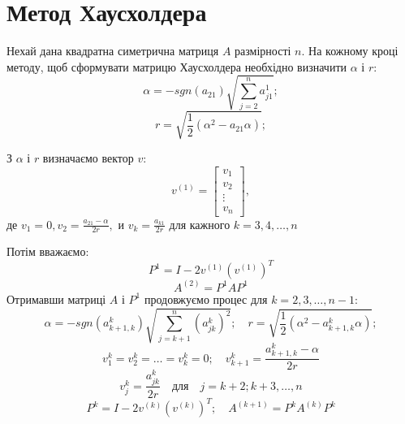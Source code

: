 \documentclass[serif,12pt,unicode]{beamer}
\begin{document}
\section{Метод Хаусхолдера}
\begin{frame}
Нехай дана квадратна симетрична матриця $A$ размірності $n.$
На кожному кроці методу, щоб сформувати матрицю Хаусхолдера необхідно визначити $\alpha$ і $r$:
\begin{equation*}
    \alpha = - sgn(a_{21}) \sqrt{\sum_{j=2}^n a_{j1}^1};
\end{equation*}
\begin{equation*}
    r = \sqrt{\frac{1}{2} (\alpha^2 - a_{21} \alpha)};
\end{equation*}

З $\alpha$ і $r$ визначаємо вектор $v:$
\begin{equation*}
    v^{(1)} = \begin{bmatrix}
        v_1\\
        v_2\\
        \vdots\\
        v_n
\end{bmatrix},
\end{equation*}
де $v_1 = 0, v_2 = \frac{a_{21} - \alpha}{2 r},$ и $v_k = \frac{a_{k1}}{2r}$ для кажного $k = 3, 4, \dots, n$
\end{frame}
\begin{frame}
Потім вважаємо:
\begin{equation*}
    P^1 = I - 2 v^{(1)} (v^{(1)})^T
\end{equation*}
\begin{equation*}
    A^{(2)} = P^1 A P^1
\end{equation*}
Отримавши матриці $A$ і $P^1$ продовжуємо процес для $k=2, 3, \dots, n-1:$
\begin{equation*}
    \alpha = -sgn(a^k_{k+1,k}) \sqrt{\sum_{j=k+1}^n (a_{jk}^k)^2}; \quad
    r = \sqrt{\frac{1}{2} (\alpha^2 - a_{k+1,k}^k \alpha)};
\end{equation*}
\begin{equation*}
    v_1^k = v_2^k = \dots = v_k^k = 0;\quad
    v_{k+1}^k = \frac{a_{k+1,k}^k - \alpha}{2r}
\end{equation*}
\begin{equation*}
    v_j^k = \frac{a_{jk}^k}{2r} \quad \text{для} \quad j = k+2; k+3, \dots, n
\end{equation*}
\begin{equation*}
    P^k = I - 2 v^{(k)} (v^{(k)})^T; \quad
    A^{(k+1)} = P^k A^{(k)} P^k
\end{equation*}

\end{frame}
\end{document}

